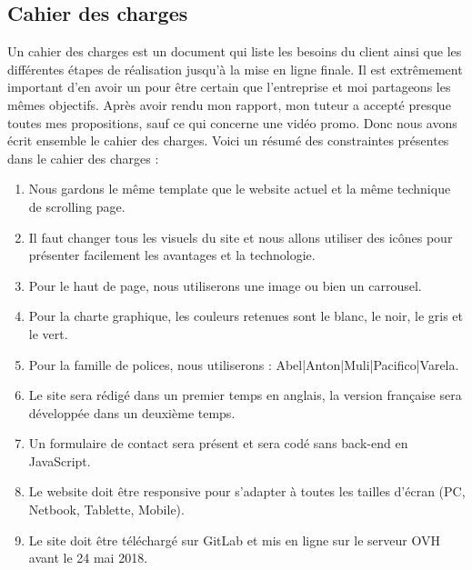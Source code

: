 \documentclass[a4paper, 12pt]{report}
\begin{document}
\subsection{Cahier des charges}
Un cahier des charges est un document qui liste les besoins du client ainsi que les différentes étapes de réalisation jusqu’à la mise en ligne finale. Il est extrêmement important d’en avoir un pour être certain que l’entreprise et moi partageons les mêmes objectifs.
Après avoir rendu mon rapport, mon tuteur a accepté presque toutes mes propositions, sauf ce qui concerne une vidéo promo. Donc nous avons écrit ensemble le cahier des charges. Voici un résumé des constraintes présentes dans le cahier des charges :\\
\newpage
\begin{enumerate}
\item Nous gardons le même template que le website actuel et la même technique de scrolling page.
\item Il faut changer tous les visuels du site et nous allons utiliser des icônes pour présenter facilement les avantages et la technologie.
\item Pour le haut de page, nous utiliserons une image ou bien un carrousel. 
\item Pour la  charte graphique, les couleurs retenues sont le blanc, le noir, le gris et le vert. 
\item Pour la famille de polices, nous utiliserons : Abel|Anton|Muli|Pacifico|Varela.
\item Le site sera rédigé dans un premier temps en anglais, la version française sera développée dans un deuxième temps.
\item Un formulaire de contact sera présent et sera codé sans back-end en JavaScript.
\item Le website doit être responsive pour s’adapter à toutes les tailles d’écran (PC, Netbook, Tablette, Mobile). 
\item Le site doit être téléchargé sur GitLab et mis en ligne sur le serveur OVH avant le 24 mai 2018.
\end{enumerate} 
\end{document}
